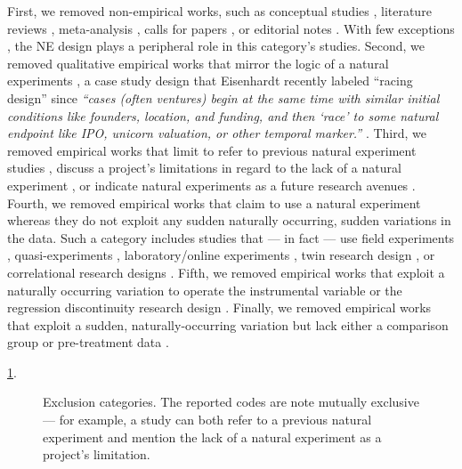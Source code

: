 First, we removed non-empirical works, such as conceptual studies 
\parencite[e.g.,][]{eden2021}, literature reviews
\parencite[e.g.,][]{shaver2020}, meta-analysis
\parencite[e.g.,][]{geyskens2006}, calls for papers
\parencite[e.g.,][]{jacquart2020}, or editorial notes
\parencite[e.g.,][]{breschi2020}. With few exceptions
\parencite[e.g.,][]{sieweke2020}, the NE design plays a peripheral role in this
category's studies. Second, we removed qualitative empirical works that mirror
the logic of a natural experiments \parencite[e.g.,][]{powell2017}, a case study
design that Eisenhardt recently labeled ``racing design'' since \textit{``cases
(often ventures) begin at the same time with similar initial conditions like
founders, location, and funding, and then `race' to some natural endpoint like
IPO, unicorn valuation, or other temporal marker.''} \parencite[page
150,][]{eisenhardt2021}.  Third, we removed empirical works that limit to refer
to previous natural experiment studies \parencite[e.g.,][]{stevens2021}, discuss
a project's limitations in regard to the lack of a natural experiment
\parencite[e.g.,][]{chen2020}, or indicate natural experiments as a future
research avenues \parencite[e.g.,][]{xie0000}.  Fourth, we removed empirical
works that claim to use a natural experiment whereas they do not exploit any
sudden naturally occurring, sudden variations in the data. Such a category
includes studies that --- in fact --- use field experiments
\parencite[e.g.,][]{lee2017}, quasi-experiments
\parencite[e.g.,][]{azoulay2014}, laboratory/online experiments
\parencite[e.g.,][]{laurieromartinez2014}, twin research design
\parencite[e.g.,][]{nicolaou2008}, or correlational research designs
\parencite[e.g.,][]{boyle2011}. Fifth, we removed empirical works that exploit a
naturally occurring variation to operate the instrumental variable
\parencite[e.g.,][]{zolotoy2018} or the regression discontinuity research design
\parencite[e.g.,][]{flammer2015}.  Finally, we removed empirical works that
exploit a sudden, naturally-occurring  variation but lack either a comparison
group \parencite[e.g.][]{corbo2016} or pre-treatment data
\parencite[e.g.,][]{desjardine2019}.

\ref{fig:exclusion_causes}. 

\begin{figure}
    \centering
    \sffamily
    \begin{small}
        \begin{center}
            
        \end{center}
        \caption{Exclusion categories. The reported codes are note mutually exclusive
        --- for example, a study can both refer to a previous natural experiment
        and mention the lack of a natural experiment as a project's limitation.}
        \label{fig:exclusion_causes}
    \end{small}
\end{figure}

